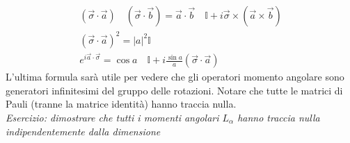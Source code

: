 \begin{itemize}
\begin{equation}
\begin{split}
\left(\vec{\sigma}\cdot\vec{a}\right)\quad\left(\vec{\sigma}\cdot\vec{b}\right)=\vec{a}\cdot\vec{b}\quad\mathbb{I}+i\vec{\sigma}\times\left(\vec{a}\times\vec{b}
\right)\\
\left(\vec{\sigma}\cdot\vec{a}\right)^2=\vert a\vert^2\mathbb{I}\\
e^{i\vec{a}\cdot\vec{\sigma}}=\cos a \quad\mathbb{I}+i\frac{\sin a}{a}\left(\vec{\sigma}\cdot\vec{a}\right)
\end{split}\end{equation}
L'ultima formula sarà utile per vedere che gli operatori momento angolare sono generatori infinitesimi del gruppo delle rotazioni. 
Notare che tutte le matrici di Pauli (tranne la matrice identità) hanno traccia nulla.\\
\textit{Esercizio: dimostrare che tutti i momenti angolari $L_\alpha$ hanno traccia nulla indipendentemente dalla dimensione}
\end{itemize}


%